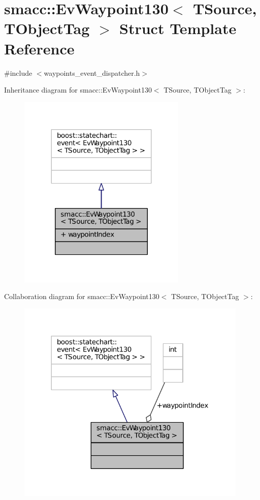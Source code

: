 \hypertarget{structsmacc_1_1EvWaypoint130}{}\section{smacc\+:\+:Ev\+Waypoint130$<$ T\+Source, T\+Object\+Tag $>$ Struct Template Reference}
\label{structsmacc_1_1EvWaypoint130}


{\ttfamily \#include $<$waypoints\+\_\+event\+\_\+dispatcher.\+h$>$}



Inheritance diagram for smacc\+:\+:Ev\+Waypoint130$<$ T\+Source, T\+Object\+Tag $>$\+:
\nopagebreak
\begin{figure}[H]
\begin{center}
\leavevmode
\includegraphics[width=227pt]{structsmacc_1_1EvWaypoint130__inherit__graph}
\end{center}
\end{figure}


Collaboration diagram for smacc\+:\+:Ev\+Waypoint130$<$ T\+Source, T\+Object\+Tag $>$\+:
\nopagebreak
\begin{figure}[H]
\begin{center}
\leavevmode
\includegraphics[width=312pt]{structsmacc_1_1EvWaypoint130__coll__graph}
\end{center}
\end{figure}
